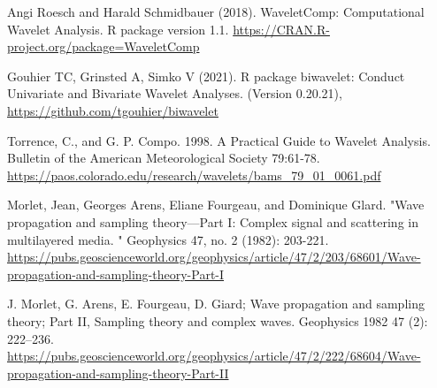 \documentclass[a4paper]{book}
\begin{document}
%
\begin{References}
Angi Roesch and Harald Schmidbauer (2018). WaveletComp: Computational
Wavelet Analysis. R package version 1.1.
\url{https://CRAN.R-project.org/package=WaveletComp}

Gouhier TC, Grinsted A, Simko V (2021). R package biwavelet: Conduct Univariate and Bivariate Wavelet Analyses. (Version 0.20.21),
\url{https://github.com/tgouhier/biwavelet}

Torrence, C., and G. P. Compo. 1998. A Practical Guide to Wavelet Analysis.
Bulletin of the American Meteorological Society 79:61-78.
\url{https://paos.colorado.edu/research/wavelets/bams_79_01_0061.pdf}

Morlet, Jean, Georges Arens, Eliane Fourgeau, and Dominique Glard.
"Wave propagation and sampling theory—Part I: Complex signal and scattering in multilayered media.
" Geophysics 47, no. 2 (1982): 203-221.
\url{https://pubs.geoscienceworld.org/geophysics/article/47/2/203/68601/Wave-propagation-and-sampling-theory-Part-I}

J. Morlet, G. Arens, E. Fourgeau, D. Giard;
Wave propagation and sampling theory; Part II, Sampling theory and complex waves.
Geophysics 1982 47 (2): 222–236. \url{https://pubs.geoscienceworld.org/geophysics/article/47/2/222/68604/Wave-propagation-and-sampling-theory-Part-II}
\end{References}
%
\end{document}
